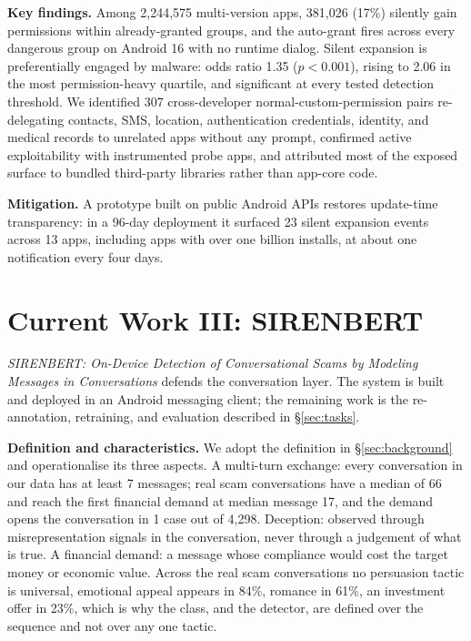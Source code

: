 \documentclass[letterpaper,11pt]{article}
\begin{document}
\textbf{Key findings.} Among 2,244,575 multi-version apps, 381,026
(17\%) silently gain permissions within already-granted groups, and
the auto-grant fires across every dangerous group on Android 16 with
no runtime dialog. Silent expansion is preferentially engaged by
malware: odds ratio 1.35 ($p<0.001$), rising to 2.06 in the most
permission-heavy quartile, and significant at every tested detection
threshold. We identified 307 cross-developer normal-custom-permission
pairs re-delegating contacts, SMS, location, authentication
credentials, identity, and medical records to unrelated apps without
any prompt, confirmed active exploitability with instrumented probe
apps, and attributed most of the exposed surface to bundled
third-party libraries rather than app-core code.

\textbf{Mitigation.} A prototype built on public Android APIs restores
update-time transparency: in a 96-day deployment it surfaced 23 silent
expansion events across 13 apps, including apps with over one billion
installs, at about one notification every four days.

\section{Current Work III: SIRENBERT}
\label{sec:sirenbert}

\emph{SIRENBERT: On-Device Detection of Conversational Scams by
Modeling Messages in Conversations} defends the conversation layer.
The system is built and deployed in an Android messaging client; the
remaining work is the re-annotation, retraining, and evaluation
described in \S\ref{sec:tasks}.

\textbf{Definition and characteristics.} We adopt the definition in
\S\ref{sec:background} and operationalise its three aspects. A
multi-turn exchange: every conversation in our data has at least 7
messages; real scam conversations have a median of 66 and reach the
first financial demand at median message 17, and the demand opens the
conversation in 1 case out of 4,298. Deception: observed through
misrepresentation signals in the conversation, never through a
judgement of what is true. A financial demand: a message whose
compliance would cost the target money or economic value. Across the
real scam conversations no persuasion tactic is universal, emotional
appeal appears in 84\%, romance in 61\%, an investment offer in 23\%,
which is why the class, and the detector, are defined over the
sequence and not over any one tactic.
\end{document}
